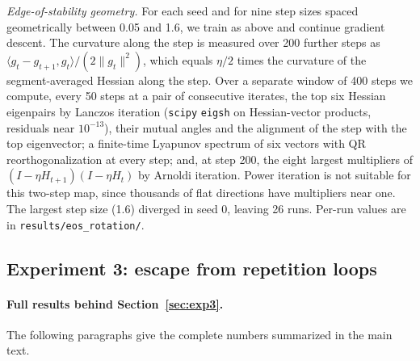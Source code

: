 \emph{Edge-of-stability geometry.} For each seed and for nine step sizes spaced geometrically between 0.05 and 1.6, we train as above and continue gradient descent. The curvature along the step is measured over 200 further steps as $\langle g_t-g_{t+1},g_t\rangle/(2\|g_t\|^2)$, which equals $\eta/2$ times the curvature of the segment-averaged Hessian along the step. Over a separate window of 400 steps we compute, every 50 steps at a pair of consecutive iterates, the top six Hessian eigenpairs by Lanczos iteration (\texttt{scipy} \texttt{eigsh} on Hessian-vector products, residuals near $10^{-13}$), their mutual angles and the alignment of the step with the top eigenvector; a finite-time Lyapunov spectrum of six vectors with QR reorthogonalization at every step; and, at step 200, the eight largest multipliers of $(I-\eta H_{t+1})(I-\eta H_t)$ by Arnoldi iteration. Power iteration is not suitable for this two-step map, since thousands of flat directions have multipliers near one. The largest step size (1.6) diverged in seed 0, leaving 26 runs. Per-run values are in \texttt{results/eos\_rotation/}.

\subsection{Experiment 3: escape from repetition loops}
\label{app:exp3}

\paragraph{Full results behind Section~\ref{sec:exp3}.} The following paragraphs give the complete numbers summarized in the main text.

